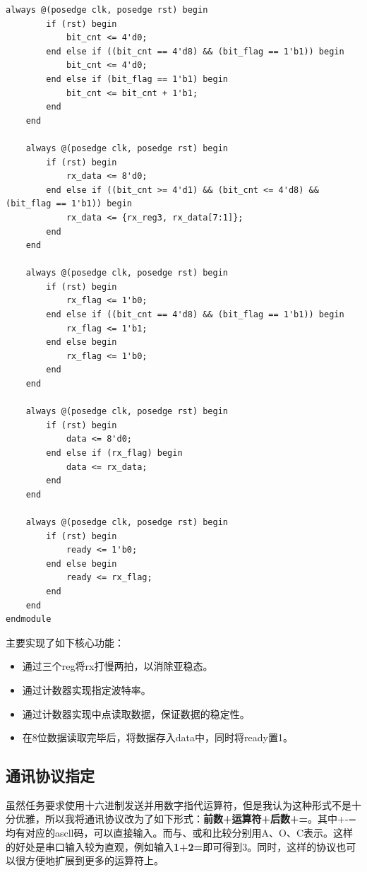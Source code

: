 \documentclass[UTF8]{ctexart}
\begin{document}
\begin{framed}
\begin{lstlisting}[style=verilogStyle]
    always @(posedge clk, posedge rst) begin
        if (rst) begin
            bit_cnt <= 4'd0;
        end else if ((bit_cnt == 4'd8) && (bit_flag == 1'b1)) begin
            bit_cnt <= 4'd0;
        end else if (bit_flag == 1'b1) begin
            bit_cnt <= bit_cnt + 1'b1;
        end
    end

    always @(posedge clk, posedge rst) begin
        if (rst) begin
            rx_data <= 8'd0;
        end else if ((bit_cnt >= 4'd1) && (bit_cnt <= 4'd8) && (bit_flag == 1'b1)) begin
            rx_data <= {rx_reg3, rx_data[7:1]};
        end
    end

    always @(posedge clk, posedge rst) begin
        if (rst) begin
            rx_flag <= 1'b0;
        end else if ((bit_cnt == 4'd8) && (bit_flag == 1'b1)) begin
            rx_flag <= 1'b1;
        end else begin
            rx_flag <= 1'b0;
        end
    end

    always @(posedge clk, posedge rst) begin
        if (rst) begin
            data <= 8'd0;
        end else if (rx_flag) begin
            data <= rx_data;
        end
    end

    always @(posedge clk, posedge rst) begin
        if (rst) begin
            ready <= 1'b0;
        end else begin
            ready <= rx_flag;
        end
    end
endmodule
    \end{lstlisting}
\end{framed}
主要实现了如下核心功能：
\begin{itemize}
    \item 通过三个reg将rx打慢两拍，以消除亚稳态。
    \item 通过计数器实现指定波特率。
    \item 通过计数器实现中点读取数据，保证数据的稳定性。
    \item 在8位数据读取完毕后，将数据存入data中，同时将ready置1。
\end{itemize}

\subsection{通讯协议指定}
虽然任务要求使用十六进制发送并用数字指代运算符，但是我认为这种形式不是十分优雅，所以我将通讯协议改为了如下形式：\textbf{前数+运算符+后数+=}。其中+-=均有对应的ascll码，可以直接输入。而与、或和比较分别用A、O、C表示。这样的好处是串口输入较为直观，例如输入\textbf{1+2=}即可得到3。同时，这样的协议也可以很方便地扩展到更多的运算符上。
\end{document}
